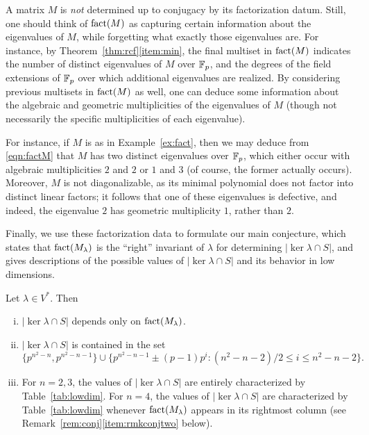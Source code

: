 \begin{rem}
A matrix $M$ is \emph{not} determined up to conjugacy by its factorization datum. Still, one should think of $\operatorname{fact}(M)$ as capturing certain information about the eigenvalues of $M$, while forgetting what exactly those eigenvalues are. For instance, by Theorem~\ref{thm:rcf}\eqref{item:min}, the final multiset in $\operatorname{fact}(M)$ indicates the number of distinct eigenvalues of $M$ over $\mathbb{F}_p$, and the degrees of the field extensions of $\mathbb{F}_p$ over which additional eigenvalues are realized. By considering previous multisets in $\operatorname{fact}(M)$ as well, one can deduce some information about the algebraic and geometric multiplicities of the eigenvalues of $M$ (though not necessarily the specific multiplicities of each eigenvalue).

For instance, if $M$ is as in Example~\ref{ex:fact}, then we may deduce from \eqref{eqn:factM} that $M$ has two distinct eigenvalues over $\mathbb{F}_p$, which either occur with algebraic multiplicities $2$ and $2$ or $1$ and $3$ (of course, the former actually occurs). Moreover, $M$ is not diagonalizable, as its minimal polynomial does not factor into distinct linear factors; it follows that one of these eigenvalues is defective, and indeed, the eigenvalue $2$ has geometric multiplicity $1$, rather than $2$.
\end{rem}

Finally, we use these factorization data to formulate our main conjecture, which states that $\operatorname{fact}(M_\lambda)$ is the ``right'' invariant of $\lambda$ for determining $|\ker\lambda\cap S|$, and gives descriptions of the possible values of $|\ker\lambda\cap S|$ and its behavior in low dimensions.

\begin{conj}
\label{conj:main}
Let $\lambda\in V^*$. Then
\begin{enumerate}[(i)]
\item $|\ker\lambda\cap S|$ depends only on $\operatorname{fact}(M_\lambda)$.
\item $|\ker\lambda\cap S|$ is contained in the set
\begin{equation}
\label{eqn:conjvalset}
\{p^{n^2-n},p^{n^2-n-1}\}\cup\{p^{n^2-n-1}\pm(p-1)p^i:(n^2-n-2)/2\le i\le n^2-n-2\}.
\end{equation}\label{item:conjvals}
\item For $n=2,3$, the values of $|\ker\lambda\cap S|$ are entirely characterized by Table~\ref{tab:lowdim}. For $n=4$, the values of $|\ker\lambda\cap S|$ are characterized by Table~\ref{tab:lowdim} whenever $\operatorname{fact}(M_\lambda)$ appears in its rightmost column (see Remark~\ref{rem:conj}\eqref{item:rmkconjtwo} below).\label{item:conjlown}
\end{enumerate}
\end{conj}


